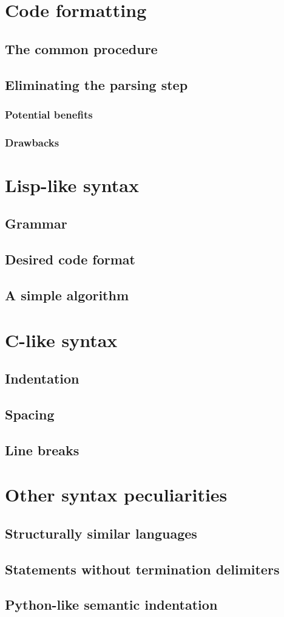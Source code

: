 \chapter{Code formatting}
\section{The common procedure}
\section{Eliminating the parsing step}
\subsection{Potential benefits}
\subsection{Drawbacks}

\chapter{Lisp-like syntax}
\section{Grammar}
\section{Desired code format}
\section{A simple algorithm}

\chapter{C-like syntax}
\section{Indentation}
\section{Spacing}
\section{Line breaks}

\chapter{Other syntax peculiarities}
\section{Structurally similar languages}
\section{Statements without termination delimiters}
\section{Python-like semantic indentation}

